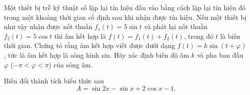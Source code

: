 \begin{bt}%
	Một thiết bị trễ kỹ thuật số lặp lại tín hiệu đầu vào bằng cách lặp lại tín hiệu đó trong một khoảng thời gian cố định sau khi nhận được tín hiệu. Nếu một thiết bị như vậy nhận được nốt thuần $f_1(t) = 5\sin t$ và phát lại nốt thuần $f_2(t) = 5\cos t$ thì âm kết hợp là $f(t)=f_1(t)+f_2(t)$, trong đó $t$ là biến thời gian. Chứng tỏ rằng âm kết hợp viết được dưới dạng $f(t) = k\sin(t+\varphi)$, tức là âm kết hợp là sóng hình sin. Hãy xác định biên độ âm $k$ và pha ban đầu $\varphi$ ($-\pi < \varphi <\pi$) của sóng âm.
\end{bt}

\begin{bt}%
	Biến đổi thành tích biểu thức sau
	\[A=\sin 2x-\sin x+2\cos x-1.\]
\end{bt}

